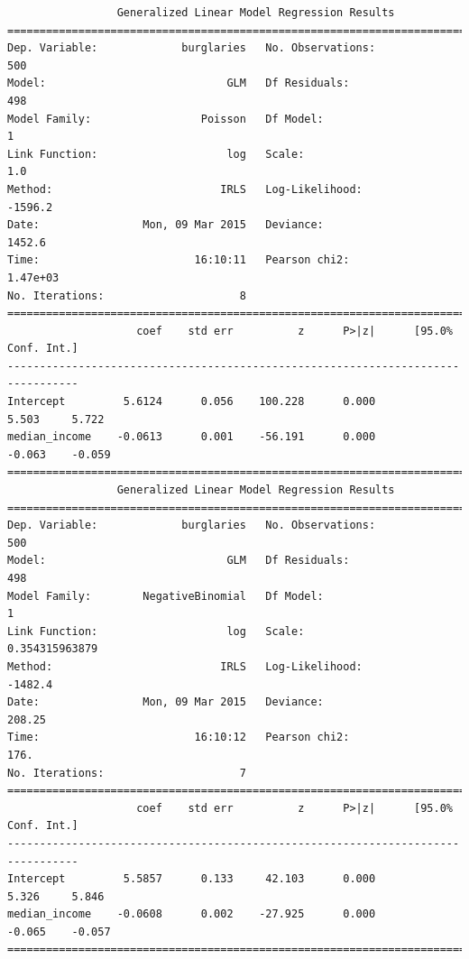\documentclass[12pt,fleqn]{article}\usepackage{../../common}
\begin{document}
\begin{verbatim}
                 Generalized Linear Model Regression Results                  
==============================================================================
Dep. Variable:             burglaries   No. Observations:                  500
Model:                            GLM   Df Residuals:                      498
Model Family:                 Poisson   Df Model:                            1
Link Function:                    log   Scale:                             1.0
Method:                          IRLS   Log-Likelihood:                -1596.2
Date:                Mon, 09 Mar 2015   Deviance:                       1452.6
Time:                        16:10:11   Pearson chi2:                 1.47e+03
No. Iterations:                     8                                         
=================================================================================
                    coef    std err          z      P>|z|      [95.0% Conf. Int.]
---------------------------------------------------------------------------------
Intercept         5.6124      0.056    100.228      0.000         5.503     5.722
median_income    -0.0613      0.001    -56.191      0.000        -0.063    -0.059
=================================================================================
                 Generalized Linear Model Regression Results                  
==============================================================================
Dep. Variable:             burglaries   No. Observations:                  500
Model:                            GLM   Df Residuals:                      498
Model Family:        NegativeBinomial   Df Model:                            1
Link Function:                    log   Scale:                  0.354315963879
Method:                          IRLS   Log-Likelihood:                -1482.4
Date:                Mon, 09 Mar 2015   Deviance:                       208.25
Time:                        16:10:12   Pearson chi2:                     176.
No. Iterations:                     7                                         
=================================================================================
                    coef    std err          z      P>|z|      [95.0% Conf. Int.]
---------------------------------------------------------------------------------
Intercept         5.5857      0.133     42.103      0.000         5.326     5.846
median_income    -0.0608      0.002    -27.925      0.000        -0.065    -0.057
=================================================================================
\end{verbatim}
\end{document}
